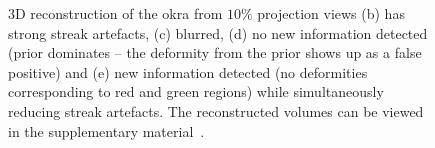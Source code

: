 \documentclass[journal]{IEEEtran}
\begin{document}
\begin{figure}[!h]
\caption{3D reconstruction of the okra from $10\%$ projection
  views (b) has strong streak artefacts, (c) blurred, (d) no new
  information detected (prior dominates -- the deformity from the prior
  shows up as a false positive) and (e) new information detected (no deformities
  corresponding to red and green regions) while simultaneously
  reducing streak artefacts. The reconstructed volumes can be viewed in the supplementary material~\cite{supp_paper}.}
\label{fig:okra_3D_results}
\end{figure}

\end{document}
